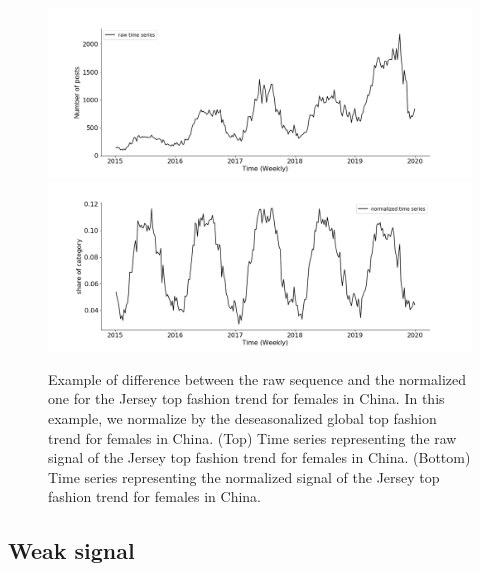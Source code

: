 \documentclass[10pt]{article} %
\begin{document}
\begin{figure}
\centering
  \includegraphics[width=1.\linewidth]{cn_female_top_raw}
  \includegraphics[width=1.\linewidth]{cn_female_top_norm}
\caption{Example of difference between the raw sequence and the normalized one for the Jersey top fashion trend for females in China. In this example, we normalize by the deseasonalized global top fashion trend for females in China. (Top) Time series representing the raw signal of the Jersey top fashion trend for females in China. (Bottom) Time series representing the normalized signal of the Jersey top fashion trend for females in China.}
\label{fig:normalization}
\end{figure}

\subsection{Weak signal}
\end{document}
